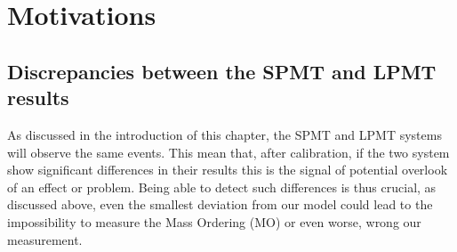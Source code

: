 \documentclass[../main.tex]{subfiles}
\begin{document}
\section{Motivations}
%
%
%
\subsection{Discrepancies between the SPMT and LPMT results}

As discussed in the introduction of this chapter, the SPMT  and LPMT systems will observe the same events. This mean that, after calibration, if the two system show significant differences in their results this is the signal of potential overlook of an effect or problem. Being able to detect such differences is thus crucial, as discussed above, even the smallest deviation from our model could lead to the impossibility to measure the Mass Ordering (MO) or even worse, wrong our measurement.
\end{document}
